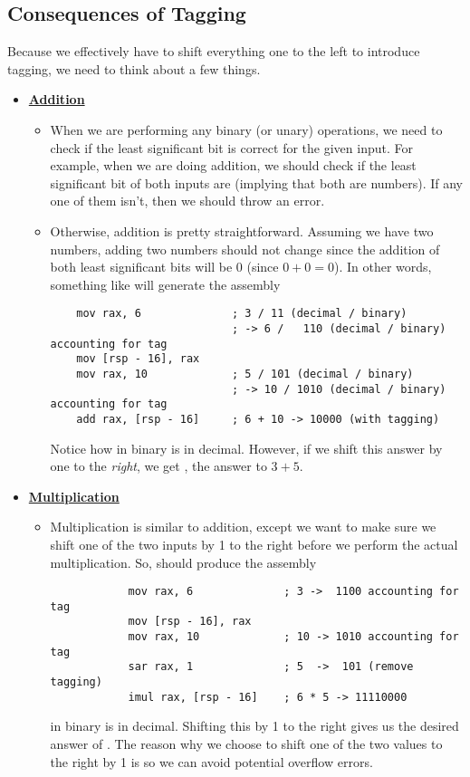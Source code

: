 \documentclass[letterpaper]{article}
\begin{document}
\subsection{Consequences of Tagging}
Because we effectively have to shift everything one to the left to introduce tagging, we need to think about a few things.
\begin{itemize}
    \item \underline{\textbf{Addition}}
    \begin{itemize}
        \item When we are performing any binary (or unary) operations, we need to check if the least significant bit is correct for the given input. For example, when we are doing addition, we should check if the least significant bit of both inputs are  (implying that both are numbers). If any one of them isn't, then we should throw an error.
        \item Otherwise, addition is pretty straightforward. Assuming we have two numbers, adding two numbers should not change since the addition of both least significant bits will be 0 (since $0 + 0 = 0$). In other words, something like  will generate the assembly 
        \begin{verbatim}
    mov rax, 6              ; 3 / 11 (decimal / binary)  
                            ; -> 6 /   110 (decimal / binary) accounting for tag
    mov [rsp - 16], rax 
    mov rax, 10             ; 5 / 101 (decimal / binary) 
                            ; -> 10 / 1010 (decimal / binary) accounting for tag 
    add rax, [rsp - 16]     ; 6 + 10 -> 10000 (with tagging)\end{verbatim}
        Notice how  in binary is  in decimal. However, if we shift this answer by one to the \emph{right}, we get , the answer to $3 + 5$.
    \end{itemize}
    \item \underline{\textbf{Multiplication}}
    \begin{itemize}
        \item Multiplication is similar to addition, except we want to make sure we shift one of the two inputs by 1 to the right before we perform the actual multiplication. So,  should produce the assembly
        \begin{verbatim}
            mov rax, 6              ; 3 ->  1100 accounting for tag
            mov [rsp - 16], rax 
            mov rax, 10             ; 10 -> 1010 accounting for tag
            sar rax, 1              ; 5  ->  101 (remove tagging)
            imul rax, [rsp - 16]    ; 6 * 5 -> 11110000\end{verbatim}
         in binary is  in decimal. Shifting this by 1 to the right gives us the desired answer of . The reason why we choose to shift one of the two values to the right by 1 is so we can avoid potential overflow errors.
    \end{itemize}


\end{itemize}
\end{document}
